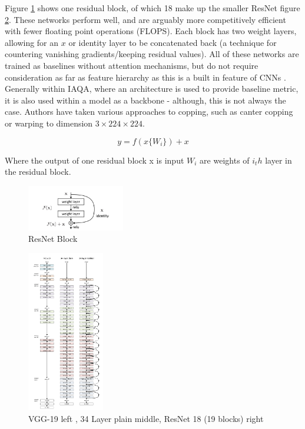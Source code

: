 Figure \ref{fig:resnet_block} shows one residual block, of which 18 make up the smaller ResNet figure \ref{fig:resnet_compared}. These networks perform well, and are arguably more competitively efficient with fewer floating point operations (FLOPS). Each block has two weight layers, allowing for an $x$ or identity layer to be concatenated back (a technique for countering vanishing gradients/keeping residual values). All of these networks are trained as baselines without attention mechanisms, but do not require consideration as far as feature hierarchy as this is a built in feature of CNNs\cite{He2016} . Generally within IAQA, where an architecture is used to provide baseline metric, it is also used within a model as a backbone - although, this is not always the case. Authors have taken various approaches to copping, such as canter copping or warping to dimension $ 3 \times 224 \times 224$.  

\begin{equation}
    y = f(x\{W_i\})+x
\end{equation}

Where the output of one residual block x is input $W_i$ are weights of $i_th$ layer in the residual block. 

\begin{figure}
    \centering
    \includegraphics[width=0.38\textwidth]{figures/Literature Review/resnetblock.png}
    \caption{ResNet Block \cite{He2016}}
    \label{fig:resnet_block}
\end{figure}

\begin{figure}
    \centering
    \includegraphics[width=0.3\textwidth]{figures/Literature Review/resnet.png}
    \caption{VGG-19 left , 34 Layer plain middle, ResNet 18 (19 blocks) right  \cite{He2016a}  }
    \label{fig:resnet_compared}
\end{figure}

